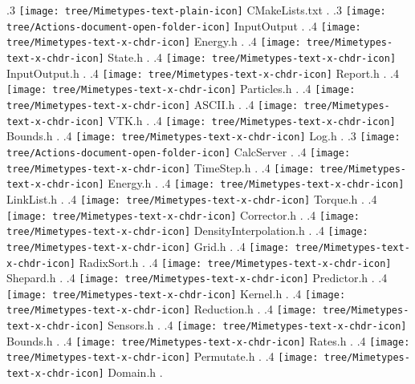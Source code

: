 {.3 { \texttt{[image: tree/Mimetypes-text-plain-icon]} CMakeLists.txt }.
.3 { \texttt{[image: tree/Actions-document-open-folder-icon]} InputOutput }.
.4 { \texttt{[image: tree/Mimetypes-text-x-chdr-icon]} Energy.h }.
.4 { \texttt{[image: tree/Mimetypes-text-x-chdr-icon]} State.h }.
.4 { \texttt{[image: tree/Mimetypes-text-x-chdr-icon]} InputOutput.h }.
.4 { \texttt{[image: tree/Mimetypes-text-x-chdr-icon]} Report.h }.
.4 { \texttt{[image: tree/Mimetypes-text-x-chdr-icon]} Particles.h }.
.4 { \texttt{[image: tree/Mimetypes-text-x-chdr-icon]} ASCII.h }.
.4 { \texttt{[image: tree/Mimetypes-text-x-chdr-icon]} VTK.h }.
.4 { \texttt{[image: tree/Mimetypes-text-x-chdr-icon]} Bounds.h }.
.4 { \texttt{[image: tree/Mimetypes-text-x-chdr-icon]} Log.h }.
.3 { \texttt{[image: tree/Actions-document-open-folder-icon]} CalcServer }.
.4 { \texttt{[image: tree/Mimetypes-text-x-chdr-icon]} TimeStep.h }.
.4 { \texttt{[image: tree/Mimetypes-text-x-chdr-icon]} Energy.h }.
.4 { \texttt{[image: tree/Mimetypes-text-x-chdr-icon]} LinkList.h }.
.4 { \texttt{[image: tree/Mimetypes-text-x-chdr-icon]} Torque.h }.
.4 { \texttt{[image: tree/Mimetypes-text-x-chdr-icon]} Corrector.h }.
.4 { \texttt{[image: tree/Mimetypes-text-x-chdr-icon]} DensityInterpolation.h }.
.4 { \texttt{[image: tree/Mimetypes-text-x-chdr-icon]} Grid.h }.
.4 { \texttt{[image: tree/Mimetypes-text-x-chdr-icon]} RadixSort.h }.
.4 { \texttt{[image: tree/Mimetypes-text-x-chdr-icon]} Shepard.h }.
.4 { \texttt{[image: tree/Mimetypes-text-x-chdr-icon]} Predictor.h }.
.4 { \texttt{[image: tree/Mimetypes-text-x-chdr-icon]} Kernel.h }.
.4 { \texttt{[image: tree/Mimetypes-text-x-chdr-icon]} Reduction.h }.
.4 { \texttt{[image: tree/Mimetypes-text-x-chdr-icon]} Sensors.h }.
.4 { \texttt{[image: tree/Mimetypes-text-x-chdr-icon]} Bounds.h }.
.4 { \texttt{[image: tree/Mimetypes-text-x-chdr-icon]} Rates.h }.
.4 { \texttt{[image: tree/Mimetypes-text-x-chdr-icon]} Permutate.h }.
.4 { \texttt{[image: tree/Mimetypes-text-x-chdr-icon]} Domain.h }.
}
